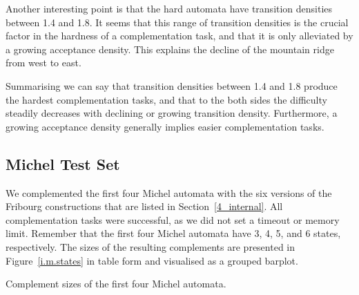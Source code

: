 Another interesting point is that the hard automata have transition densities between 1.4 and 1.8. It seems that this range of transition densities is the crucial factor in the hardness of a complementation task, and that it is only alleviated by a growing acceptance density. This explains the decline of the mountain ridge from west to east.

Summarising we can say that transition densities between 1.4 and 1.8 produce the hardest complementation tasks, and that to the both sides the difficulty steadily decreases with declining or growing transition density. Furthermore, a growing acceptance density generally implies easier complementation tasks.


\subsection{Michel Test Set}
We complemented the first four Michel automata with the six versions of the Fribourg constructions that are listed in Section~\ref{4_internal}. All complementation tasks were successful, as we did not set a timeout or memory limit. Remember that the first four Michel automata have 3, 4, 5, and 6 states, respectively. The sizes of the resulting complements are presented in Figure~\ref{i.m.states} in table form and visualised as a grouped barplot.

\begin{table}[ht]
\centering

\caption{Complement sizes of the first four Michel automata.}
\label{i.m.states}
\end{table}

%     


